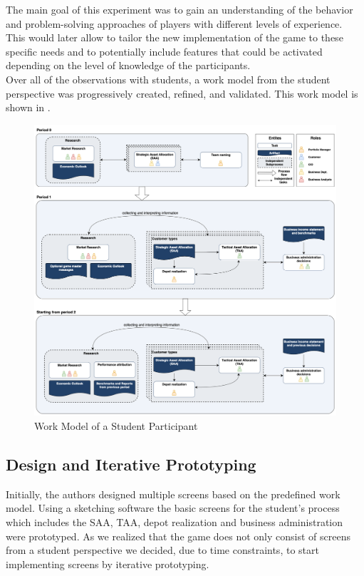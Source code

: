 The main goal of this experiment was to gain an understanding of the behavior and problem-solving approaches of players with different levels of experience. This would later allow to tailor the new implementation of the game to these specific needs and to potentially include features that could be activated depending on the level of knowledge of the participants. \\

Over all of the observations with students, a work model from the student perspective was progressively created, refined, and validated. This work model is shown in .

\begin{figure}[h!]
  \centering
  \includegraphics[scale=0.25]{img/work_model_pfm_game.png}
  \caption{Work Model of a Student Participant}
  \label{fig:work_model_student}
\end{figure}




\subsection{Design and Iterative Prototyping}
Initially, the authors designed multiple screens based on the predefined work model. Using a sketching software the basic screens for the student's process which includes the SAA, TAA, depot realization and business administration were prototyped. As we realized that the game does not only consist of screens from a student perspective we decided, due to time constraints, to start implementing screens by iterative prototyping. \\

